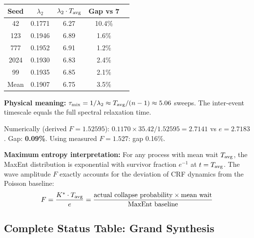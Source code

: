 \documentclass[12pt, a4paper]{article}
\begin{document}
\begin{keybox}[title={$\lambda_2\cdot T_{\rm avg}\approx n-1$ (Candidate, 3.5\%)}]
\begin{center}
\begin{tabular}{ccccc}
\toprule
Seed & $\lambda_2$ & $\lambda_2\cdot T_{\rm avg}$ & Gap vs 7\\
\midrule
42   & 0.1771 & 6.27 & 10.4\%\\
123  & 0.1946 & 6.89 & 1.6\%\\
777  & 0.1952 & 6.91 & 1.2\%\\
2024 & 0.1930 & 6.83 & 2.4\%\\
99   & 0.1935 & 6.85 & 2.1\%\\
\midrule
Mean & 0.1907 & 6.75 & 3.5\%\\
\bottomrule
\end{tabular}
\end{center}
\textbf{Physical meaning:} $\tau_{\rm mix}=1/\lambda_2\approx T_{\rm avg}/(n-1)\approx 5.06$ sweeps.
The inter-event timescale equals the full spectral relaxation time.
\end{keybox}

\begin{keybox}[title={Jaynes Identity $K^*\cdot T_{\rm avg}/F=e$ (Candidate, 0.09\%)}]
Numerically (derived $F=1.52595$): $0.1170\times 35.42/1.52595=2.7141$ vs $e=2.7183$.
Gap: \textbf{0.09\%}. Using measured $F=1.527$: gap 0.16\%.

\textbf{Maximum entropy interpretation:} For any process with mean wait $T_{\rm avg}$, the MaxEnt distribution is exponential with survivor fraction $e^{-1}$ at $t=T_{\rm avg}$. The wave amplitude $F$ exactly accounts for the deviation of CRF dynamics from the Poisson baseline:
\[
  F = \frac{K^*\cdot T_{\rm avg}}{e} = \frac{\text{actual collapse probability}\times\text{mean wait}}{\text{MaxEnt baseline}}
\]
\end{keybox}

\subsection{Complete Status Table: Grand Synthesis}
\end{document}
